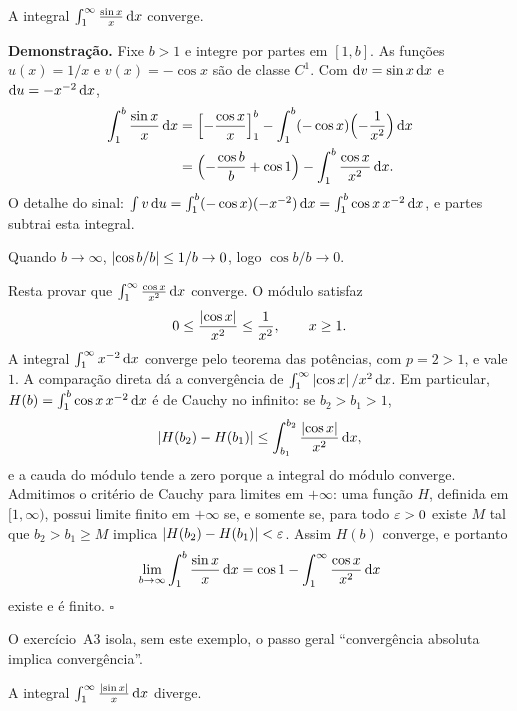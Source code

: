 \documentclass[11pt,a4paper]{article}
\begin{document}
\begin{teorema}
A integral \(\int_1^{\infty}\frac{\sin x}{x}\,\mathrm{d} x\) converge.
\end{teorema}

\noindent\textbf{Demonstração.}
Fixe \(b>1\) e integre por partes em \([1,b]\). As funções \(u(x)=1/x\) e \(v(x)=-\cos x\) são de classe \(C^1\). Com \(\mathrm{d} v=\sin x\,\mathrm{d} x\) e \(\mathrm{d} u=-x^{-2}\,\mathrm{d} x\),
\begin{align*}
\int_1^{b}\frac{\sin x}{x}\,\mathrm{d} x
&=\Bigl[-\frac{\cos x}{x}\Bigr]_1^{b}-\int_1^{b}(-\cos x)\Bigl(-\frac{1}{x^{2}}\Bigr)\,\mathrm{d} x\\
&=\Bigl(-\frac{\cos b}{b}+\cos 1\Bigr)-\int_1^{b}\frac{\cos x}{x^{2}}\,\mathrm{d} x.
\end{align*}
O detalhe do sinal: \(\int v\,\mathrm{d} u=\int_1^{b}(-\cos x)(-x^{-2})\,\mathrm{d} x=\int_1^{b}\cos x\,x^{-2}\,\mathrm{d} x\), e partes subtrai esta integral.

Quando \(b\to\infty\), \(\left\lvert \cos b/b \right\rvert\le 1/b\to 0\), logo \(\cos b/b\to 0\).

Resta provar que \(\int_1^{\infty}\frac{\cos x}{x^{2}}\,\mathrm{d} x\) converge. O módulo satisfaz
\[
0\le\frac{\left\lvert \cos x \right\rvert}{x^{2}}\le\frac{1}{x^{2}},\qquad x\ge 1.
\]
A integral \(\int_1^{\infty} x^{-2}\,\mathrm{d} x\) converge pelo teorema das potências, com \(p=2>1\), e vale \(1\). A comparação direta dá a convergência de \(\int_1^{\infty}\left\lvert \cos x \right\rvert/x^{2}\,\mathrm{d} x\). Em particular, \(H(b)=\int_1^{b}\cos x\,x^{-2}\,\mathrm{d} x\) é de Cauchy no infinito: se \(b_{2}>b_{1}>1\),
\[
\left\lvert H(b_{2})-H(b_{1}) \right\rvert
\le\int_{b_{1}}^{b_{2}}\frac{\left\lvert \cos x \right\rvert}{x^{2}}\,\mathrm{d} x,
\]
e a cauda do módulo tende a zero porque a integral do módulo converge. Admitimos o critério de Cauchy para limites em \(+\infty\): uma função \(H\), definida em \([1,\infty)\), possui limite finito em \(+\infty\) se, e somente se, para todo \(\varepsilon>0\) existe \(M\) tal que \(b_{2}>b_{1}\ge M\) implica \(\left\lvert H(b_{2})-H(b_{1}) \right\rvert<\varepsilon\). Assim \(H(b)\) converge, e portanto
\[
\lim_{b\to\infty}\int_1^{b}\frac{\sin x}{x}\,\mathrm{d} x
=\cos 1-\int_1^{\infty}\frac{\cos x}{x^{2}}\,\mathrm{d} x
\]
existe e é finito.
\hfill\(\square\)

O exercício~A3 isola, sem este exemplo, o passo geral ``convergência absoluta implica convergência''.

\begin{teorema}
A integral \(\int_1^{\infty}\frac{\left\lvert \sin x \right\rvert}{x}\,\mathrm{d} x\) diverge.
\end{teorema}
\end{document}
